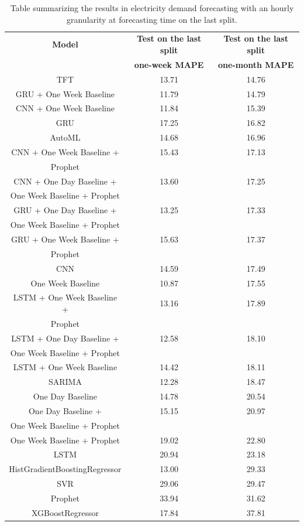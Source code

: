 \begin{table}[H]
\centering
\begin{tabular}{|c|c|c|}
\hline
\textbf{Model} & \textbf{Test on the last split} & \textbf{Test on the last split}\\
 & \textbf{one-week MAPE} & \textbf{one-month MAPE}\\
\hline
TFT & 13.71 & 14.76\\
\hline
GRU + One Week Baseline & 11.79 & 14.79\\
\hline
CNN + One Week Baseline & 11.84 & 15.39\\
\hline
GRU & 17.25 & 16.82\\
\hline
AutoML & 14.68 & 16.96\\
\hline
CNN + One Week Baseline + & 15.43 & 17.13\\
Prophet & & \\
\hline
CNN + One Day Baseline + & 13.60 & 17.25\\
One Week Baseline + Prophet & & \\
\hline
GRU + One Day Baseline + & 13.25 & 17.33\\
One Week Baseline + Prophet & & \\
\hline
GRU + One Week Baseline + & 15.63 & 17.37\\
Prophet & & \\
\hline
CNN & 14.59 & 17.49\\
\hline
One Week Baseline & 10.87 & 17.55\\
\hline
LSTM + One Week Baseline + & 13.16 & 17.89\\
Prophet & & \\
\hline
LSTM + One Day Baseline + & 12.58 & 18.10\\
One Week Baseline + Prophet & & \\
\hline
LSTM + One Week Baseline & 14.42 & 18.11\\
\hline
SARIMA & 12.28 & 18.47\\
\hline
One Day Baseline & 14.78 & 20.54\\
\hline
One Day Baseline + & 15.15 & 20.97\\
One Week Baseline + Prophet & & \\
\hline
One Week Baseline + Prophet & 19.02 & 22.80\\
\hline
LSTM & 20.94 & 23.18\\
\hline
HistGradientBoostingRegressor & 13.00 & 29.33\\
\hline
SVR & 29.06 & 29.47\\
\hline
Prophet & 33.94 & 31.62\\
\hline
XGBoostRegressor & 17.84 & 37.81\\
\hline
\end{tabular}
\caption{Table summarizing the results in electricity demand forecasting with an hourly granularity at forecasting time on the last split.}
\label{tab:demandhourlyresultsforecast}
\end{table}

